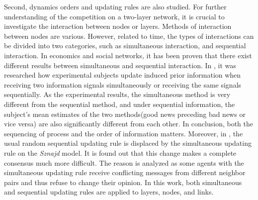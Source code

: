 Second, dynamics orders and updating rules are also studied. For further understanding of the competition on a two-layer network, it is crucial to investigate the interaction between nodes or layers. Methods of interaction between nodes are various. However, related to time, the types of interactions can be divided into two categories, such as simultaneous interaction, and sequential interaction\parencite{sirbu2017}. In economics and social networks, it has been proven that there exist different results between simultaneous and sequential interaction\parencite{hoffman2011, dietrich2004}. In \parencite{hoffman2011}, it was researched how experimental subjects update induced prior information when receiving two information signals simultaneously or receiving the same signals sequentially. As the experimental results, the simultaneous method is very different from the sequential method, and under sequential information, the subject’s mean estimates of the two methods(good news preceding bad news or vice versa) are also significantly different from each other. In conclusion, both the sequencing of process and the order of information matters. Moreover, in \parencite{dietrich2004}, the usual random sequential updating rule is displaced by the simultaneous updating rule on the \textit{Sznajd} model. It is found out that this change makes a complete consensus much more difficult. The reason is analyzed as some agents with the simultaneous updating rule receive conflicting messages from different neighbor pairs and thus refuse to change their opinion. In this work, both simultaneous and sequential updating rules are applied to layers, nodes, and links.

